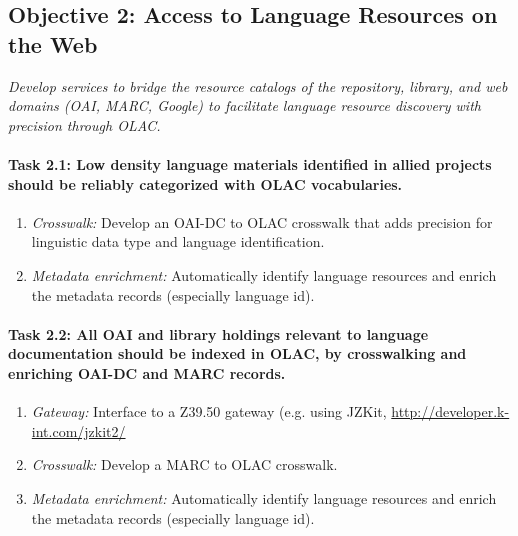 \subsection*{Objective 2: Access to Language Resources on the Web}

\emph{Develop services to bridge the resource catalogs of the
  repository, library, and web domains (OAI, MARC, Google)
  to facilitate language resource discovery with precision through OLAC.}

\def\task{2.1}
\paragraph{Task {\task}: Low density language materials identified in allied projects
      should be reliably categorized with OLAC vocabularies.}

\begin{enumerate}[label=\emph{\task\alph*}]
\item \emph{Crosswalk:}
  Develop an OAI-DC to OLAC crosswalk that adds precision for linguistic data
  type and language identification.
\item \emph{Metadata enrichment:}
  Automatically identify language resources and
  enrich the metadata records (especially language id).
\end{enumerate}

\def\task{2.2}
\paragraph{Task {\task}: All OAI and library holdings relevant to language
      documentation should be indexed in OLAC, by
      crosswalking and enriching OAI-DC and MARC records.}

\begin{enumerate}[label=\emph{\task\alph*}]
\item \emph{Gateway:}
  Interface to a Z39.50 gateway (e.g. using JZKit,
  \url{http://developer.k-int.com/jzkit2/}
\item \emph{Crosswalk:}
  Develop a MARC to OLAC crosswalk.
\item \emph{Metadata enrichment:}
  Automatically identify language resources and
  enrich the metadata records (especially language id).
\end{enumerate}



